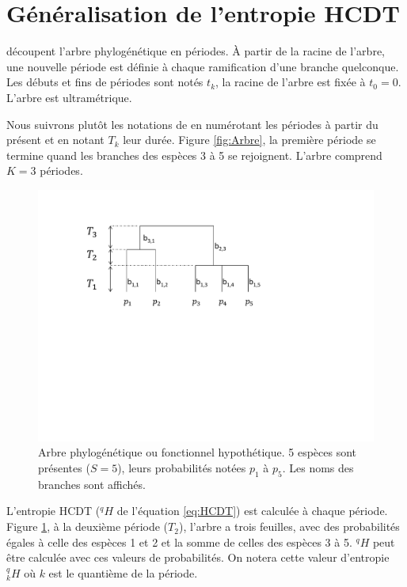 \documentclass[
  11pt,
  french,
  a4paper,
  extrafontsizes,onecolumn,openright
  ]{memoir}
\begin{document}
\hypertarget{guxe9nuxe9ralisation-de-lentropie-hcdt}{%
\section{Généralisation de l'entropie HCDT}\label{guxe9nuxe9ralisation-de-lentropie-hcdt}}

\textcite{Pavoine2009} découpent l'arbre phylogénétique en périodes.
À partir de la racine de l'arbre, une nouvelle période est définie à chaque ramification d'une branche quelconque.
Les débuts et fins de périodes sont notés \(t_k\), la racine de l'arbre est fixée à \(t_0=0\).
L'arbre est ultramétrique.

Nous suivrons plutôt les notations de \textcite{Chao2010} en numérotant les périodes à partir du présent et en notant \(T_k\) leur durée.
Figure \ref{fig:Arbre}, la première période se termine quand les branches des espèces 3 à 5 se rejoignent.
L'arbre comprend \(K=3\) périodes.



\scriptsize

\begin{figure}

{\centering \includegraphics[width=0.8\linewidth]{images/ArbreA} 

}

\caption{Arbre phylogénétique ou fonctionnel hypothétique. 5 espèces sont présentes (\(S=5\)), leurs probabilités notées \(p_1\) à \(p_5\). Les noms des branches sont affichés.}\label{fig:ArbreA5}
\end{figure}

\normalsize

L'entropie HCDT (\(^{q}\!H\) de l'équation \eqref{eq:HCDT}) est calculée à chaque période.
Figure \ref{fig:ArbreA5}, à la deuxième période (\(T_2\)), l'arbre a trois feuilles, avec des probabilités égales à celle des espèces 1 et 2 et la somme de celles des espèces 3 à 5.
\(^{q}\!H\) peut être calculée avec ces valeurs de probabilités.
On notera cette valeur d'entropie \(^{q}_{k}\!H\) où \(k\) est le quantième de la période.
\end{document}
